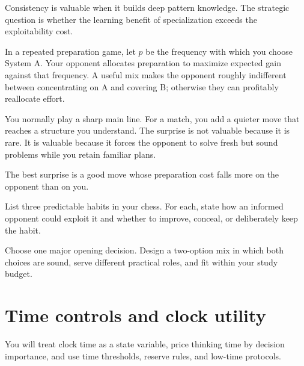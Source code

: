 Consistency is valuable when it builds deep pattern knowledge. The strategic question is whether the learning benefit of specialization exceeds the exploitability cost.

\begin{formalbox}
In a repeated preparation game, let $p$ be the frequency with which you choose System A. Your opponent allocates preparation to maximize expected gain against that frequency. A useful mix makes the opponent roughly indifferent between concentrating on A and covering B; otherwise they can profitably reallocate effort.
\end{formalbox}

\begin{workedbox}[title={Worked example: surprise with substance}]
You normally play a sharp main line. For a match, you add a quieter move that reaches a structure you understand. The surprise is not valuable because it is rare. It is valuable because it forces the opponent to solve fresh but sound problems while you retain familiar plans.
\end{workedbox}

\begin{memorybox}
The best surprise is a good move whose preparation cost falls more on the opponent than on you.
\end{memorybox}

\begin{exercise}
List three predictable habits in your chess. For each, state how an informed opponent could exploit it and whether to improve, conceal, or deliberately keep the habit.
\end{exercise}

\begin{exercise}
Choose one major opening decision. Design a two-option mix in which both choices are sound, serve different practical roles, and fit within your study budget.
\end{exercise}


\chapter{Time controls and clock utility}
\begin{learningbox}
You will treat clock time as a state variable, price thinking time by decision importance, and use time thresholds, reserve rules, and low-time protocols.
\end{learningbox}

